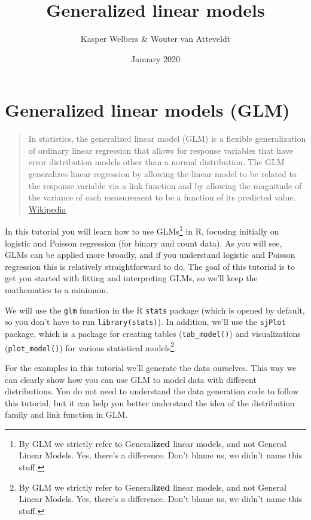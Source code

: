 \documentclass[
]{article}
\title{Generalized linear models}
\author{Kasper Welbers \& Wouter van Atteveldt}
\date{January 2020}
\begin{document}
\maketitle

{
\setcounter{tocdepth}{2}
\tableofcontents
}
\hypertarget{generalized-linear-models-glm}{%
\section{Generalized linear models
(GLM)}\label{generalized-linear-models-glm}}

\begin{quote}
In statistics, the generalized linear model (GLM) is a flexible
generalization of ordinary linear regression that allows for response
variables that have error distribution models other than a normal
distribution. The GLM generalizes linear regression by allowing the
linear model to be related to the response variable via a link function
and by allowing the magnitude of the variance of each measurement to be
a function of its predicted value.
\href{https://en.wikipedia.org/wiki/Generalized_linear_model}{Wikipedia}
\end{quote}

In this tutorial you will learn how to use GLMs\footnote{By GLM we
  strictly refer to General\textbf{ized} linear models, and not General
  Linear Models. Yes, there's a difference. Don't blame us, we didn't
  name this stuff.} in R, focusing initially on logistic and Poisson
regression (for binary and count data). As you will see, GLMs can be
applied more broadly, and if you understand logistic and Poisson
regression this is relatively straightforward to do. The goal of this
tutorial is to get you started with fitting and interpreting GLMs, so
we'll keep the mathematics to a minimum.

We will use the \texttt{glm} function in the R \texttt{stats} package
(which is opened by default, so you don't have to run
\texttt{library(stats)}). In addition, we'll use the \texttt{sjPlot}
package, which is a package for creating tables (\texttt{tab\_model()})
and visualizations (\texttt{plot\_model()}) for various statistical
models\footnote{By GLM we strictly refer to General\textbf{ized} linear
  models, and not General Linear Models. Yes, there's a difference.
  Don't blame us, we didn't name this stuff.}.

For the examples in this tutorial we'll generate the data ourselves.
This way we can clearly show how you can use GLM to model data with
different distributions. You do not need to understand the data
generation code to follow this tutorial, but it can help you better
understand the idea of the distribution family and link function in GLM.
\end{document}
